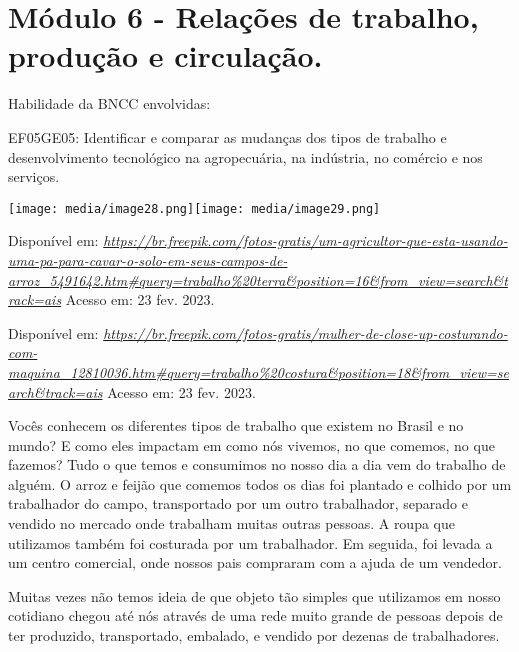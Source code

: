 \section{Módulo 6 - Relações de trabalho, produção e
circulação.}\label{muxf3dulo-6---relauxe7uxf5es-de-trabalho-produuxe7uxe3o-e-circulauxe7uxe3o.}

Habilidade da BNCC envolvidas:

EF05GE05: Identificar e comparar as mudanças dos tipos de trabalho e
desenvolvimento tecnológico na agropecuária, na indústria, no comércio e
nos serviços.

\texttt{[image: media/image28.png]}\texttt{[image: media/image29.png]}

Disponível em:
\href{https://br.freepik.com/fotos-gratis/um-agricultor-que-esta-usando-uma-pa-para-cavar-o-solo-em-seus-campos-de-arroz_5491642.htm\#query=trabalho\%20terra\&position=16\&from_view=search\&track=ais}{\emph{https://br.freepik.com/fotos-gratis/um-agricultor-que-esta-usando-uma-pa-para-cavar-o-solo-em-seus-campos-de-arroz\_5491642.htm\#query=trabalho\%20terra\&position=16\&from\_view=search\&track=ais}}
Acesso em: 23 fev. 2023.

Disponível em:
\href{https://br.freepik.com/fotos-gratis/mulher-de-close-up-costurando-com-maquina_12810036.htm\#query=trabalho\%20costura\&position=18\&from_view=search\&track=ais}{\emph{https://br.freepik.com/fotos-gratis/mulher-de-close-up-costurando-com-maquina\_12810036.htm\#query=trabalho\%20costura\&position=18\&from\_view=search\&track=ais}}
Acesso em: 23 fev. 2023.

Vocês conhecem os diferentes tipos de trabalho que existem no Brasil e
no mundo? E como eles impactam em como nós vivemos, no que comemos, no
que fazemos? Tudo o que temos e consumimos no nosso dia a dia vem do
trabalho de alguém. O arroz e feijão que comemos todos os dias foi
plantado e colhido por um trabalhador do campo, transportado por um
outro trabalhador, separado e vendido no mercado onde trabalham muitas
outras pessoas. A roupa que utilizamos também foi costurada por um
trabalhador. Em seguida, foi levada a um centro comercial, onde nossos
pais compraram com a ajuda de um vendedor.

Muitas vezes não temos ideia de que objeto tão simples que utilizamos em
nosso cotidiano chegou até nós através de uma rede muito grande de
pessoas depois de ter produzido, transportado, embalado, e vendido por
dezenas de trabalhadores.

